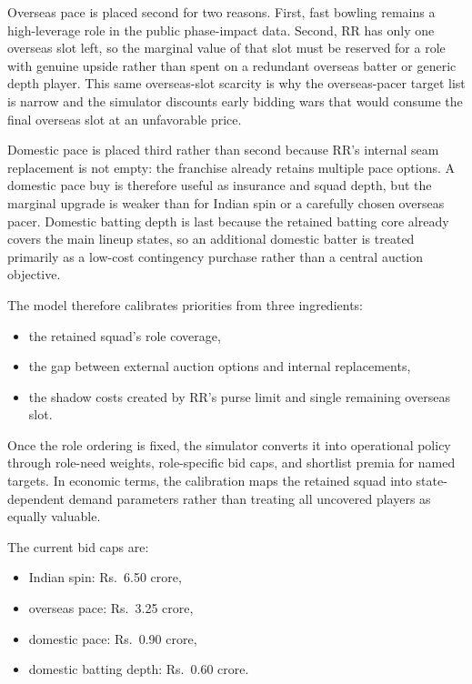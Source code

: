 \documentclass[11pt]{article}
\begin{document}
Overseas pace is placed second for two reasons. First, fast bowling remains a high-leverage role in the public phase-impact data. Second, RR has only one overseas slot left, so the marginal value of that slot must be reserved for a role with genuine upside rather than spent on a redundant overseas batter or generic depth player. This same overseas-slot scarcity is why the overseas-pacer target list is narrow and the simulator discounts early bidding wars that would consume the final overseas slot at an unfavorable price.

Domestic pace is placed third rather than second because RR's internal seam replacement is not empty: the franchise already retains multiple pace options. A domestic pace buy is therefore useful as insurance and squad depth, but the marginal upgrade is weaker than for Indian spin or a carefully chosen overseas pacer. Domestic batting depth is last because the retained batting core already covers the main lineup states, so an additional domestic batter is treated primarily as a low-cost contingency purchase rather than a central auction objective.

The model therefore calibrates priorities from three ingredients:
\begin{itemize}[leftmargin=1.5em]
    \item the retained squad's role coverage,
    \item the gap between external auction options and internal replacements,
    \item the shadow costs created by RR's purse limit and single remaining overseas slot.
\end{itemize}

Once the role ordering is fixed, the simulator converts it into operational policy through role-need weights, role-specific bid caps, and shortlist premia for named targets. In economic terms, the calibration maps the retained squad into state-dependent demand parameters rather than treating all uncovered players as equally valuable.

The current bid caps are:
\begin{itemize}[leftmargin=1.5em]
    \item Indian spin: Rs.\ 6.50 crore,
    \item overseas pace: Rs.\ 3.25 crore,
    \item domestic pace: Rs.\ 0.90 crore,
    \item domestic batting depth: Rs.\ 0.60 crore.
\end{itemize}
\end{document}
